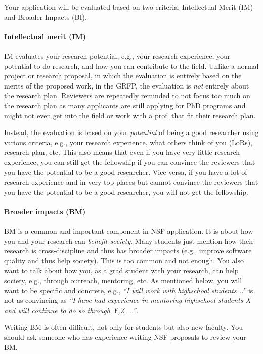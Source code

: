 \documentclass[oneside,11pt]{book}
\begin{document}
Your application will be evaluated based on two criteria: Intellectual Merit (IM) and Broader Impacts (BI). 

\paragraph{Intellectual merit (IM)} IM evaluates your research potential, e.g., your research experience, your potential to do research, and how you can contribute to the field.   Unlike a normal project or research proposal, in which the evaluation is entirely based on the merits of the proposed work, in the GRFP, the evaluation is \emph{not} entirely about the research plan. Reviewers are repeatedly reminded to not focus too much on the research plan as many applicants are still applying for PhD programs and might not even get into the field or work with a prof. that fit their research plan. 

Instead, the evaluation is based on your \emph{potential} of being a good researcher using various criteria, e.g., your research experience, what others think of you (LoRs), research plan, etc. This also means that even if you have very little research experience, you can still get the fellowship if you can convince the reviewers that you have the potential to be a good researcher.  Vice versa, if you have a lot of research experience and in very top places but cannot convince the reviewers that you have the potential to be a good researcher, you will not get the fellowship.

\paragraph{Broader impacts (BM)} BM is a common and important component in NSF application. It is about how you and your research can \emph{benefit society}.  Many students just mention how their research is cross-discipline and thus has broader impacts (e.g., improve software quality and thus help society).  This is too common and not enough.  You also want to talk about how you, as a grad student with your research, can help society, e.g., through outreach, mentoring, etc. As mentioned below, you will want to be specific and concrete, e.g., \emph{``I will work with highschool students ..''} is not as convincing as \emph{``I have had experience in mentoring highschool students X and will continue to do so through Y,Z ...''}.  

Writing BM is often difficult, not only for students but also new faculty.  You should ask someone who has experience writing NSF proposals to review your BM.
\end{document}
